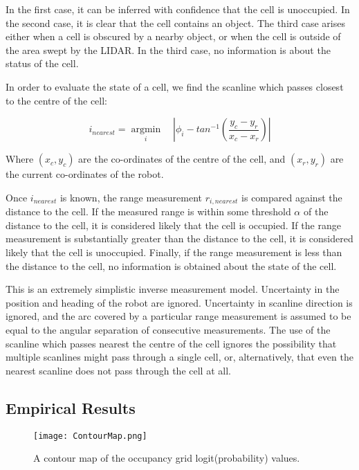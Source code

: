 \documentclass[11pt]{article} %
\begin{document}
In the first case, it can be inferred with confidence that the cell is unoccupied.  
In the second case, it is clear that the cell contains an object.  
The third case arises either when a cell is obscured by a nearby object, or when the cell is outside of the area swept by the LIDAR.  In the third case, no information is about the status of the cell.

In order to evaluate the state of a cell, we find the scanline which passes closest to the centre of the cell:

\begin{equation}
i_{nearest} = \underset{i}{\operatorname{argmin}} \quad | \phi_i - tan^{-1}(\frac{y_c - y_r}{x_c - x_r}) |
\end{equation}

Where $(x_c, y_c)$ are the co-ordinates of the centre of the cell, and $(x_r, y_r)$ are the current co-ordinates of the robot.  

Once $i_{nearest}$ is known, the range measurement $r_{i,nearest}$ is compared against the distance to the cell.  If the measured range is within some threshold $\alpha$ of the distance to the cell, it is considered likely that the cell is occupied.  If the range measurement is substantially greater than the distance to the cell, it is considered likely that the cell is unoccupied.  Finally, if the range measurement is less than the distance to the cell, no information is obtained about the state of the cell.

This is an extremely simplistic inverse measurement model.  Uncertainty in the position and heading of the robot are ignored.  Uncertainty in scanline direction is ignored, and the arc covered by a particular range measurement is assumed to be equal to the angular separation of consecutive measurements.  The use of the scanline which passes nearest the centre of the cell ignores the possibility that multiple scanlines might pass through a single cell, or, alternatively, that even the nearest scanline does not pass through the cell at all.  

\subsection{Empirical Results}

\begin{figure}[hbt]
 \centering
 \texttt{[image: ContourMap.png]}
 \caption{A contour map of the occupancy grid logit(probability) values.}
 \label{contour}
\end{figure}
\end{document}
